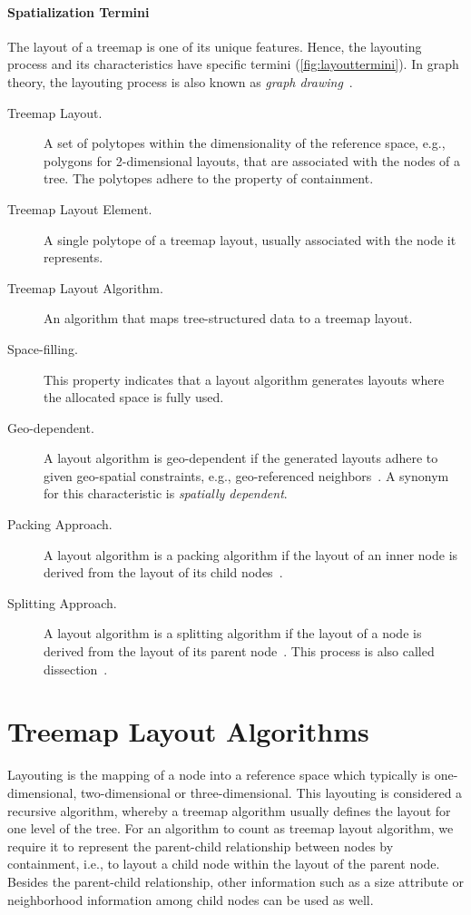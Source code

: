 \documentclass[sigconf%
,natbib=true%
]{acmart}
\begin{document}
\paragraph{\textbf{Spatialization Termini}}
The layout of a treemap is one of its unique features.
Hence, the layouting process and its characteristics have specific termini (\autoref{fig:layouttermini}).
In graph theory, the layouting process is also known as \emph{graph drawing}~\cite{eppstein2012-areauniversal}.
\begin{description}
	\item[Treemap Layout.] A set of polytopes within the dimensionality of the reference space, e.g., polygons for 2-dimensional layouts, that are associated with the nodes of a tree. The polytopes adhere to the property of containment.
	\item[Treemap Layout Element.] A single polytope of a treemap layout, usually associated with the node it represents.
	\item[Treemap Layout Algorithm.] An algorithm that maps tree-struc\-tured data to a treemap layout.
	\item[Space-filling.] This property indicates that a layout algorithm generates layouts where the allocated space is fully used.
	\item[Geo-dependent.] A layout algorithm is geo-dependent if the generated layouts adhere to given geo-spatial constraints, e.g., geo-referenced neighbors~\cite{slingsby2009-configuring,buchin2011-adjacency}. A synonym for this characteristic is \emph{spatially dependent}.
	\item[Packing Approach.] A layout algorithm is a packing algorithm if the layout of an inner node is derived from the layout of its child nodes~\cite{schulz2011-implicit}.
	\item[Splitting Approach.] A layout algorithm is a splitting algorithm if the layout of a node is derived from the layout of its parent node~\cite{schulz2011-implicit}.
	This process is also called dissection~\cite{namagochi2007-dissecting}.
\end{description}

\section{Treemap Layout Algorithms}
Layouting is the mapping of a node into a reference space which typically is one-dimensional, two-dimensional or three-dimensional.
This layouting is considered a recursive algorithm, whereby a treemap algorithm usually defines the layout for one level of the tree.
For an algorithm to count as treemap layout algorithm, we require it to represent the parent-child relationship between nodes by containment, i.e., to layout a child node within the layout of the parent node. %
Besides the parent-child relationship, other information such as a size attribute or neighborhood information among child nodes can be used as well.
\end{document}
